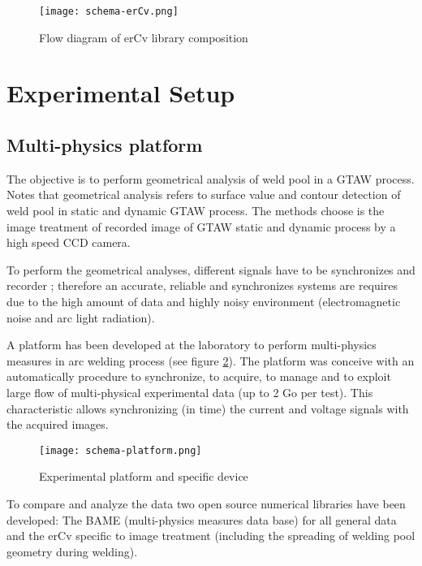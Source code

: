\begin{Segmentation}
\begin{figure}
\begin{center}
\texttt{[image: schema-erCv.png]}
\caption{{\small Flow diagram of erCv library composition}}
\label{schema-erCv}
\end{center}
\end{figure}



\section{Experimental Setup}
\label{experimental_setup}

\subsection{Multi-physics platform}
\label{multi_physics_platform}

The objective is to perform geometrical analysis of weld pool in a GTAW process. Notes that geometrical analysis refers to surface value and contour detection of weld pool in static and dynamic GTAW process. The methods choose is the image treatment of recorded image of GTAW static and dynamic process by a high speed CCD camera.

To perform the geometrical analyses, different signals have to be synchronizes and recorder \cite{CHAPUIS}; therefore an accurate, reliable and synchronizes systems are requires due to the high amount of data and highly noisy environment (electromagnetic noise and arc light radiation). 

A platform has been developed at the laboratory to perform multi-physics measures in arc welding process (see figure \ref{schema-platform}). The platform was conceive with an automatically procedure to synchronize, to acquire, to manage and to exploit large flow of multi-physical experimental data (up to 2 Go per test). This characteristic allows synchronizing (in time) the current and voltage signals with the acquired images.

\begin{figure}
\begin{center}
\texttt{[image: schema-platform.png]}
\caption{{\small Experimental platform and specific device}}
\label{schema-platform}
\end{center}
\end{figure}

To compare and analyze the data two open source numerical libraries have been developed: The BAME (multi-physics measures data base) for all general data and the erCv specific to image treatment (including the spreading of welding pool geometry during welding).




\end{Segmentation}
